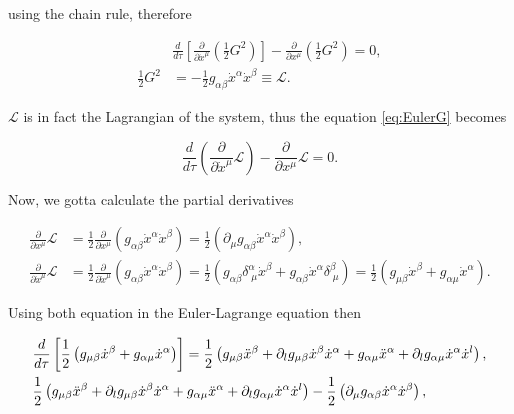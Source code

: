         using the chain rule, therefore

        \begin{align*}
            &\frac{d}{d\tau}\left[\frac{\partial}{\partial\Dot{x}^{\mu}}\left(\frac{1}{2}G^2\right) \right] - \frac{\partial}{\partial x^{\mu}}\left(\frac{1}{2}G^2 \right) = 0,\\
            \frac{1}{2}G^2 &= -\frac{1}{2}g_{\alpha\beta}\Dot{x}^{\alpha}\Dot{x}^{\beta} \equiv \mathcal{L}.
        \end{align*}

        $\mathcal{L}$ is in fact the Lagrangian of the system, thus the equation \ref{eq:EulerG} becomes

        \begin{equation}
            \frac{d}{d\tau}\left(\frac{\partial}{\partial \Dot{x}^{\mu}}\mathcal{L} \right) - \frac{\partial}{\partial x^{\mu}}\mathcal{L} = 0.
        \end{equation}

        Now, we gotta calculate the partial derivatives

        \begin{align}
            \frac{\partial}{\partial x^{\mu}}\mathcal{L} &= \frac{1}{2}\frac{\partial}{\partial x^{\mu}}\left(g_{\alpha\beta}\Dot{x}^{\alpha}\Dot{x}^{\beta} \right) = \frac{1}{2}\left(\partial_{\mu}g_{\alpha\beta}\Dot{x}^{\alpha}\Dot{x}^{\beta} \right),\\
            \frac{\partial}{\partial \Dot{x}^{\mu}}\mathcal{L} &= \frac{1}{2}\frac{\partial}{\partial \Dot{x}^{\mu}}\left(g_{\alpha\beta}\Dot{x}^{\alpha}\Dot{x}^{\beta} \right) = \frac{1}{2}\left(g_{\alpha\beta}\delta^{\alpha}_{\;\mu}\Dot{x}^{\beta} + g_{\alpha\beta}\Dot{x}^{\alpha}\delta^{\beta}_{\;\mu} \right) = \frac{1}{2}\left(g_{\mu\beta}\Dot{x}^{\beta} + g_{\alpha\mu}\Dot{x}^{\alpha} \right).
        \end{align}

        Using both equation in the Euler-Lagrange equation then

        \begin{align*}
            &\frac{d}{d\tau}\left[\frac{1}{2}\left(g_{\mu\beta}\Dot{x}^{\beta} + g_{\alpha\mu}\Dot{x}^{\alpha} \right) \right] = \frac{1}{2}\left(g_{\mu\beta}\Ddot{x}^{\beta} + \partial_{l}g_{\mu\beta}\Dot{x}^{\beta}\Dot{x}^{\alpha} + g_{\alpha\mu}\Ddot{x}^{\alpha} + \partial_lg_{\alpha\mu}\Dot{x}^{\alpha}\Dot{x}^l \right),\\
            &\frac{1}{2}\left(g_{\mu\beta}\Ddot{x}^{\beta} + \partial_{l}g_{\mu\beta}\Dot{x}^{\beta}\Dot{x}^{\alpha} + g_{\alpha\mu}\Ddot{x}^{\alpha} + \partial_lg_{\alpha\mu}\Dot{x}^{\alpha}\Dot{x}^l \right) - \frac{1}{2}\left(\partial_{\mu}g_{\alpha\beta}\Dot{x}^{\alpha}\Dot{x}^{\beta} \right),
        \end{align*}

